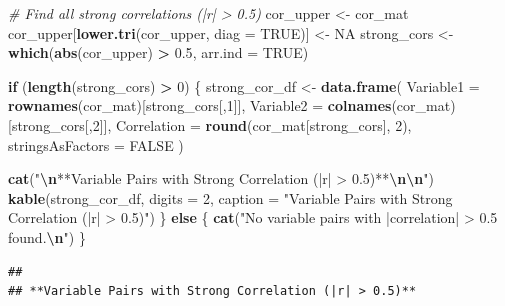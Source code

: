 \documentclass[
]{article}
\newenvironment{Shaded}{\begin{snugshade}}{\end{snugshade}}
\newcommand{\AttributeTok}[1]{\textcolor[rgb]{0.13,0.29,0.53}{#1}}
\newcommand{\CommentTok}[1]{\textcolor[rgb]{0.56,0.35,0.01}{\textit{#1}}}
\newcommand{\ConstantTok}[1]{\textcolor[rgb]{0.56,0.35,0.01}{#1}}
\newcommand{\ControlFlowTok}[1]{\textcolor[rgb]{0.13,0.29,0.53}{\textbf{#1}}}
\newcommand{\DecValTok}[1]{\textcolor[rgb]{0.00,0.00,0.81}{#1}}
\newcommand{\FloatTok}[1]{\textcolor[rgb]{0.00,0.00,0.81}{#1}}
\newcommand{\FunctionTok}[1]{\textcolor[rgb]{0.13,0.29,0.53}{\textbf{#1}}}
\newcommand{\NormalTok}[1]{#1}
\newcommand{\OtherTok}[1]{\textcolor[rgb]{0.56,0.35,0.01}{#1}}
\newcommand{\SpecialCharTok}[1]{\textcolor[rgb]{0.81,0.36,0.00}{\textbf{#1}}}
\newcommand{\StringTok}[1]{\textcolor[rgb]{0.31,0.60,0.02}{#1}}
\begin{document}
\begin{Shaded}
\begin{Highlighting}[]
\CommentTok{\# Find all strong correlations (|r| \textgreater{} 0.5)}
\NormalTok{cor\_upper }\OtherTok{\textless{}{-}}\NormalTok{ cor\_mat}
\NormalTok{cor\_upper[}\FunctionTok{lower.tri}\NormalTok{(cor\_upper, }\AttributeTok{diag =} \ConstantTok{TRUE}\NormalTok{)] }\OtherTok{\textless{}{-}} \ConstantTok{NA}
\NormalTok{strong\_cors }\OtherTok{\textless{}{-}} \FunctionTok{which}\NormalTok{(}\FunctionTok{abs}\NormalTok{(cor\_upper) }\SpecialCharTok{\textgreater{}} \FloatTok{0.5}\NormalTok{, }\AttributeTok{arr.ind =} \ConstantTok{TRUE}\NormalTok{)}

\ControlFlowTok{if}\NormalTok{ (}\FunctionTok{length}\NormalTok{(strong\_cors) }\SpecialCharTok{\textgreater{}} \DecValTok{0}\NormalTok{) \{}
\NormalTok{  strong\_cor\_df }\OtherTok{\textless{}{-}} \FunctionTok{data.frame}\NormalTok{(}
    \AttributeTok{Variable1 =} \FunctionTok{rownames}\NormalTok{(cor\_mat)[strong\_cors[,}\DecValTok{1}\NormalTok{]],}
    \AttributeTok{Variable2 =} \FunctionTok{colnames}\NormalTok{(cor\_mat)[strong\_cors[,}\DecValTok{2}\NormalTok{]],}
    \AttributeTok{Correlation =} \FunctionTok{round}\NormalTok{(cor\_mat[strong\_cors], }\DecValTok{2}\NormalTok{),}
    \AttributeTok{stringsAsFactors =} \ConstantTok{FALSE}
\NormalTok{  )}

  
  \FunctionTok{cat}\NormalTok{(}\StringTok{"}\SpecialCharTok{\textbackslash{}n}\StringTok{**Variable Pairs with Strong Correlation (|r| \textgreater{} 0.5)**}\SpecialCharTok{\textbackslash{}n\textbackslash{}n}\StringTok{"}\NormalTok{)}
  \FunctionTok{kable}\NormalTok{(strong\_cor\_df, }\AttributeTok{digits =} \DecValTok{2}\NormalTok{, }\AttributeTok{caption =} \StringTok{"Variable Pairs with Strong Correlation (|r| \textgreater{} 0.5)"}\NormalTok{)}
\NormalTok{\} }\ControlFlowTok{else}\NormalTok{ \{}
  \FunctionTok{cat}\NormalTok{(}\StringTok{"No variable pairs with |correlation| \textgreater{} 0.5 found.}\SpecialCharTok{\textbackslash{}n}\StringTok{"}\NormalTok{)}
\NormalTok{\}}
\end{Highlighting}
\end{Shaded}

\begin{verbatim}
## 
## **Variable Pairs with Strong Correlation (|r| > 0.5)**
\end{verbatim}
\end{document}
